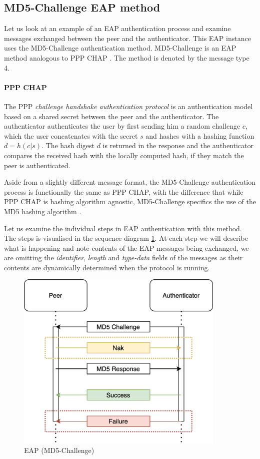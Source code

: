 \subsection{MD5-Challenge EAP method}
Let us look at an example of an EAP authentication process and examine messages exchanged between the peer and the authenticator. This EAP instance uses the MD5-Challenge authentication method.
MD5-Challenge is an EAP method analogous to PPP CHAP \cite{simpson1996ppp}. The method is denoted by the message type 4.

\paragraph{PPP CHAP}
The PPP \textit{challenge handshake authentication protocol} is an authentication model based on a shared secret between the peer and the authenticator.
The authenticator authenticates the user by first sending him a random challenge $c$, which the user concatenates with the secret $s$ and hashes with a hashing function $d = h(c | s)$.
The hash digest $d$ is returned in the response and the authenticator compares the received hash with the locally computed hash, if they match the peer is authenticated.

Aside from a slightly different message format, the MD5-Challenge authentication process is functionally the same as PPP CHAP, with the difference that while PPP CHAP is hashing algorithm agnostic, MD5-Challenge specifics the use of the MD5 hashing algorithm \cite{rivest1992md5}.

\bigskip
\noindent
Let us examine the individual steps in EAP authentication with this method. 
The steps is visualised in the sequence diagram \ref{fig:eap-md5}.
At each step we will describe what is happening and note contents of the EAP messages being exchanged, we are omitting the \textit{identifier}, \textit{length} and \textit{type-data} fields of the messages as their contents are dynamically determined when the protocol is running.

\begin{figure}[h]
	\centering
	\includegraphics[width=10cm]{images/eap-md5-2}
	\caption{EAP (MD5-Challenge)}
	\label{fig:eap-md5}
\end{figure}

